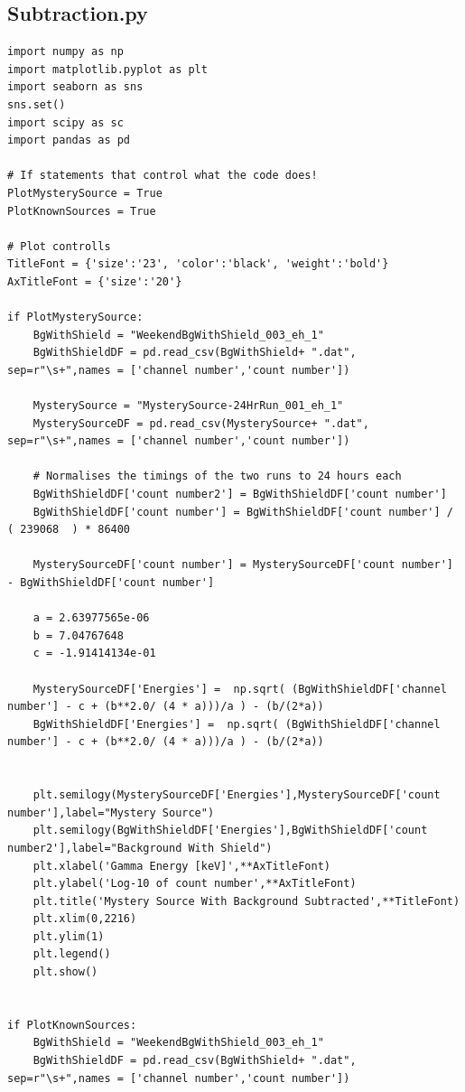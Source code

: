 \documentclass[11pt,a4paper]{article}
\begin{document}
\subsection{Subtraction.py}
\begin{verbatim}
import numpy as np
import matplotlib.pyplot as plt
import seaborn as sns
sns.set()
import scipy as sc
import pandas as pd

# If statements that control what the code does! 
PlotMysterySource = True
PlotKnownSources = True

# Plot controlls
TitleFont = {'size':'23', 'color':'black', 'weight':'bold'} 
AxTitleFont = {'size':'20'}

if PlotMysterySource:
	BgWithShield = "WeekendBgWithShield_003_eh_1"
	BgWithShieldDF = pd.read_csv(BgWithShield+ ".dat", sep=r"\s+",names = ['channel number','count number'])
	
	MysterySource = "MysterySource-24HrRun_001_eh_1"
	MysterySourceDF = pd.read_csv(MysterySource+ ".dat", sep=r"\s+",names = ['channel number','count number'])
	
	# Normalises the timings of the two runs to 24 hours each
	BgWithShieldDF['count number2'] = BgWithShieldDF['count number'] 
	BgWithShieldDF['count number'] = BgWithShieldDF['count number'] / ( 239068  ) * 86400
	
	MysterySourceDF['count number'] = MysterySourceDF['count number'] - BgWithShieldDF['count number']
	
	a = 2.63977565e-06
	b = 7.04767648
	c = -1.91414134e-01

	MysterySourceDF['Energies'] =  np.sqrt( (BgWithShieldDF['channel number'] - c + (b**2.0/ (4 * a)))/a ) - (b/(2*a))
	BgWithShieldDF['Energies'] =  np.sqrt( (BgWithShieldDF['channel number'] - c + (b**2.0/ (4 * a)))/a ) - (b/(2*a))

	
	plt.semilogy(MysterySourceDF['Energies'],MysterySourceDF['count number'],label="Mystery Source")
	plt.semilogy(BgWithShieldDF['Energies'],BgWithShieldDF['count number2'],label="Background With Shield")
	plt.xlabel('Gamma Energy [keV]',**AxTitleFont)
	plt.ylabel('Log-10 of count number',**AxTitleFont)
	plt.title('Mystery Source With Background Subtracted',**TitleFont)
	plt.xlim(0,2216)
	plt.ylim(1)
	plt.legend()
	plt.show()


if PlotKnownSources:
	BgWithShield = "WeekendBgWithShield_003_eh_1"
	BgWithShieldDF = pd.read_csv(BgWithShield+ ".dat", sep=r"\s+",names = ['channel number','count number'])
	

\end{verbatim}
\end{document}
